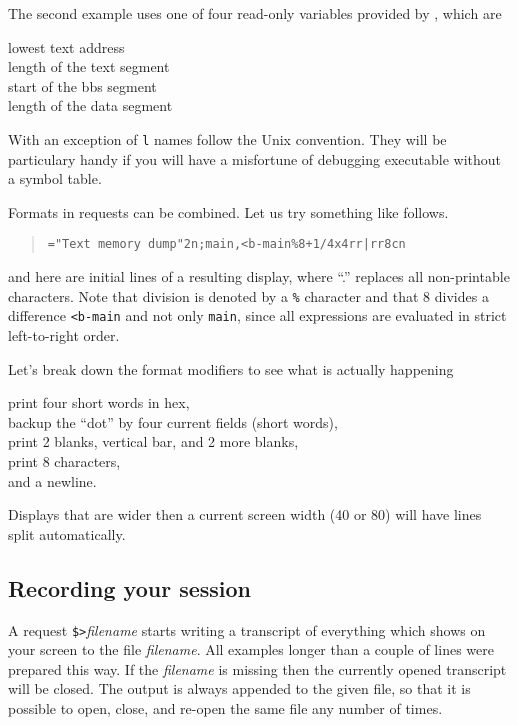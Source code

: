 The second example uses one of four read-only variables provided by
\szadb, which are
\begin{exmpl}
	lowest text address\\
	length of the text segment\\
	start of the bbs segment\\
	length of the data segment
\end{exmpl}
With an exception of {\tt l} names follow the {\sc Unix} convention.
They will be particulary handy if you will have 
a misfortune of debugging executable without a symbol table.

Formats in requests can be combined.  Let us try something like
follows.
\begin{quote}
   {\tt ="Text memory dump"2n;main,<b-main\%8+1/4x4\carret rr|rr8cn}
\end{quote}
and here are initial lines of a resulting display, where ``.''
replaces all non-printable characters.
Note that division is denoted by a \verb|%| character and that 8
divides a difference \verb|<b-main| and not only \verb|main|,
since all expressions are evaluated in strict left-to-right order.

Let's break down the format modifiers to see what is actually happening
\begin{exmpl}
   print four short words in hex,\\
  \makebox[.70in][l]{\tt 4\carret} backup the ``dot'' by four
	current fields (short words),\\
   print 2 blanks, 
       vertical bar, and 2 more blanks,\\
   print 8 characters,\\
   and a newline.
\end{exmpl}

Displays that are wider then a current screen width (40 or 80) will
have lines split automatically.

\subsection{Recording your session}
A request \verb|$>|{\sl filename\/} starts writing a transcript 
of everything which shows
on your screen to the file {\sl filename}. All examples longer than a couple of
lines were prepared this way. If the {\sl filename\/}
is missing then the currently
opened transcript will be closed. The output is always appended to the given
file, so that it is possible to open, close, and re-open the same file any
number of times.

